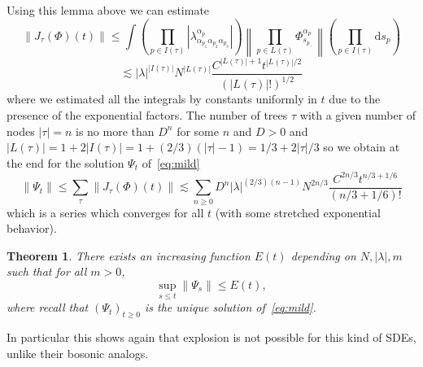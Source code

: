 \documentclass[11pt]{article}
\newcommand{\mathd}{\mathrm{d}}
\newtheorem{theorem}{Theorem}
\begin{document}
Using this lemma above we can estimate
\[ \| J_{\tau} (\Phi) (t) \| \leqslant \int \left( \prod_{p \in I (\tau)}
   \left| \lambda^{\alpha_p}_{\alpha_{p_1} \alpha_{p_2} \alpha_{p_3}} \right|
   \right) \left\| \prod_{p \in L (\tau)} \Phi^{\alpha_p}_{s_{p_-}} \right\|
   \left( \prod_{p \in I (\tau)} \mathd s_p \right) \]
\[ \lesssim | \lambda |^{| I (\tau) |} N^{| L (\tau) |} \frac{C^{| L (\tau) |
   + 1} t^{| L (\tau) | / 2}}{(| L (\tau) | !)^{1 / 2}} \]
where we estimated all the integrals by constants uniformly in $t$ due to the
presence of the exponential factors. The number of trees $\tau$ with a given
number of nodes $| \tau | = n$ is no more than $D^n$ for some $n$ and $D > 0$
and $| L (\tau) | = 1 + 2 | I (\tau) | = 1 + (2 / 3) (| \tau | - 1) = 1 / 3 +
2 | \tau | / 3$ so we obtain at the end for the solution $\Psi_t$
of~{\eqref{eq:mild}}
\[ \| \Psi_t \| \leqslant \sum_{\tau} \| J_{\tau} (\Phi) (t) \| \lesssim
   \sum_{n \geqslant 0} D^n | \lambda |^{(2 / 3) (n - 1)} N^{2 n / 3}
   \frac{C^{2 n / 3} t^{n / 3 + 1 / 6}}{(n / 3 + 1 / 6) !} \]
which is a series which converges for all $t$ (with some stretched exponential
behavior).

\begin{theorem}
  There exists an increasing function $E (t)$ depending on $N, | \lambda |, m$
  such that for all $m > 0$,
  \[ \sup_{s \leqslant t} \| \Psi_s \| \leqslant E (t), \]
  where recall that $(\Psi_t)_{t \geqslant 0}$ is the unique solution
  of~{\eqref{eq:mild}}.
\end{theorem}

In particular this shows again that explosion is not possible for this kind of
SDEs, unlike their bosonic analogs.

\
\end{document}

